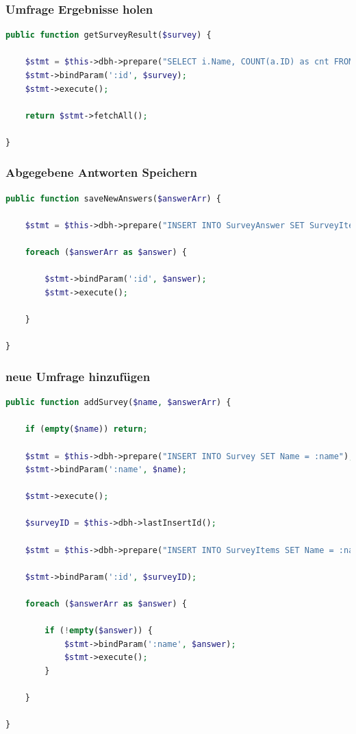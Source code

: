 \documentclass[xcolor=dvipsnames]{beamer}
\begin{document}
\begin{frame}[fragile] %
  \frametitle{Umfrage Ergebnisse holen} %

\begin{lstlisting}[language=PHP, caption=getSurveyResult Funktion]
public function getSurveyResult($survey) {
		
    $stmt = $this->dbh->prepare("SELECT i.Name, COUNT(a.ID) as cnt FROM SurveyItems i LEFT JOIN SurveyAnswer a ON i.ID = a. SurveyItemID WHERE i.SurveyID = :id GROUP BY Name ORDER BY i.Name");
    $stmt->bindParam(':id', $survey);
    $stmt->execute();
		
    return $stmt->fetchAll();
		
}
\end{lstlisting} 
\end{frame}

\begin{frame}[fragile] %
  \frametitle{Abgegebene Antworten Speichern} %

\begin{lstlisting}[language=PHP, caption=saveNewAnswers Funktion]
public function saveNewAnswers($answerArr) {

    $stmt = $this->dbh->prepare("INSERT INTO SurveyAnswer SET SurveyItemID = :id");
		
    foreach ($answerArr as $answer) {

        $stmt->bindParam(':id', $answer);
        $stmt->execute();	
			
    }
	
}
\end{lstlisting} 
\end{frame}

\begin{frame} %
  \frametitle{neue Umfrage hinzufügen} %

\begin{lstlisting}[language=PHP, caption=addSurvey Funktion]
public function addSurvey($name, $answerArr) {
		
    if (empty($name)) return;
		
    $stmt = $this->dbh->prepare("INSERT INTO Survey SET Name = :name");
    $stmt->bindParam(':name', $name);
		
    $stmt->execute();

    $surveyID = $this->dbh->lastInsertId();
		
    $stmt = $this->dbh->prepare("INSERT INTO SurveyItems SET Name = :name, SurveyID = :id");
		
    $stmt->bindParam(':id', $surveyID);

    foreach ($answerArr as $answer) {

        if (!empty($answer)) {
            $stmt->bindParam(':name', $answer);
            $stmt->execute();
        }
			
    }
		
}
\end{lstlisting} 
\end{frame}
\end{document}
